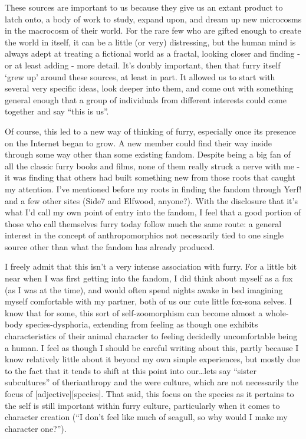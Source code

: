These sources are important to us because they give us an extant product to latch onto, a body of work to study, expand upon, and dream up new microcosms in the macrocosm of their world. For the rare few who are gifted enough to create the world in itself, it can be a little (or very) distressing, but the human mind is always adept at treating a fictional world as a fractal, looking closer and finding - or at least adding - more detail. It's doubly important, then that furry itself `grew up' around these sources, at least in part. It allowed us to start with several very specific ideas, look deeper into them, and come out with something general enough that a group of individuals from different interests could come together and say ``this is us''.

Of course, this led to a new way of thinking of furry, especially once its presence on the Internet began to grow. A new member could find their way inside through some way other than some existing fandom. Despite being a big fan of all the classic furry books and films, none of them really struck a nerve with me - it was finding that others had built something new from those roots that caught my attention. I've mentioned before my roots in finding the fandom through Yerf! and a few other sites (Side7 and Elfwood, anyone?). With the disclosure that it's what I'd call my own point of entry into the fandom, I feel that a good portion of those who call themselves furry today follow much the same route: a general interest in the concept of anthropomorphics not necessarily tied to one single source other than what the fandom has already produced.

I freely admit that this isn't a very intense association with furry. For a little bit near when I was first getting into the fandom, I did think about myself as a fox (as I was at the time), and would often spend nights awake in bed imagining myself comfortable with my partner, both of us our cute little fox-sona selves. I know that for some, this sort of self-zoomorphism can become almost a whole-body species-dysphoria, extending from feeling as though one exhibits characteristics of their animal character to feeling decidedly uncomfortable being a human. I feel as though I should be careful writing about this, partly because I know relatively little about it beyond my own simple experiences, but mostly due to the fact that it tends to shift at this point into our\ldots{}lets say ``sister subcultures'' of therianthropy and the were culture, which are not necessarily the focus of {[}adjective{]}{[}species{]}. That said, this focus on the species as it pertains to the self is still important within furry culture, particularly when it comes to character creation (``I don't feel like much of seagull, so why would I make my character one?'').

